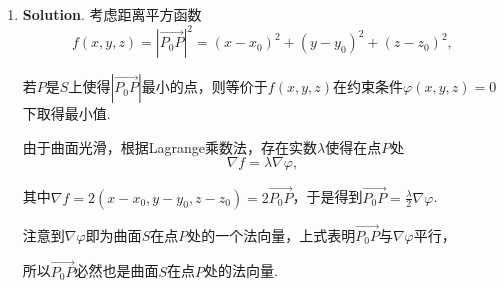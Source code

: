 \documentclass[../Main.tex]{subfiles}
\begin{document}
\begin{enumerate}
          考察$\lim_{\substack{x\to 0 \\ y\to 0}}\frac{f(x,y)-f(0,0)-f_{x}(0,0)x-f_{y}(0,0)y}{\sqrt{x^{2}+y^{2}}}
              = \lim_{\substack{x\to 0 \\ y\to 0}}\frac{\sqrt{|xy|}\sin\left(x^{2}+y^{2}\right)}{\left(x^{2}+y^{2}\right)\sqrt{x^2+y^2}}$.

          当$y=x,x\to0,y\to0$时，$\lim_{\substack{x\to 0 \\ y\to 0}}\sqrt{\frac{|xy|}{x^{2}+y^{2}}}
              = \lim_{x\to0}\sqrt{\frac{x^{2}}{2x^{2}}}= \frac{\sqrt{2}}{2}$，所以$\lim_{\substack{x\to 0 \\ y\to 0}}
              \frac{\sqrt{|xy|}\sin\left(x^{2}+y^{2}\right)}{\left(x^{2}+y^{2}\right)\sqrt{x^2+y^2}}
              \neq 0$，

          因此函数$f(x,y)$在原点处不可微.

    \item \textbf{Solution}. 考虑距离平方函数
          \[
              f(x,y,z) = \left|\overrightarrow{P_0P}\right|^{2} = (x-x_{0})^{2}+(y-y_{0}
              )^{2}+(z-z_{0})^{2},
          \]

          若$P$是$S$上使得$\left|\overrightarrow{P_0P}\right|$最小的点，则等价于$f(x,
              y,z)$在约束条件$\varphi(x,y,z)=0$下取得最小值.

          由于曲面光滑，根据Lagrange乘数法，存在实数$\lambda$使得在点$P$处
          \[
              \nabla f = \lambda \nabla \varphi,
          \]

          其中$\nabla f = 2(x-x_{0}, y-y_{0}, z-z_{0})=2\overrightarrow{P_0P}$，于是得到$\overrightarrow
              {P_0P}= \frac{\lambda}{2}\nabla \varphi$.

          注意到$\nabla \varphi$即为曲面$S$在点$P$处的一个法向量，上式表明$\overrightarrow
              {P_0P}$与$\nabla \varphi$平行，

          所以$\overrightarrow{P_0P}$必然也是曲面$S$在点$P$处的法向量.
\end{enumerate}
\end{document}
